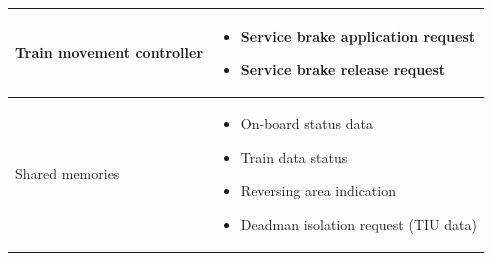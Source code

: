 \documentclass[nocc]{template/openetcs_report}
\begin{document}
\begin{longtable}{|l|l|}
				\hline
				
					\begin{minipage}[t]{0.35\linewidth} Train movement controller	\end{minipage} 
				&	\begin{minipage}[t]{0.65\linewidth}
						\begin{itemize}
							\item Service brake application request
							\item Service brake release request
						\end{itemize}			
					\end{minipage} \\
				
				\hline
				
					\begin{minipage}[t]{0.35\linewidth} Shared memories	\end{minipage} 
				&	\begin{minipage}[t]{0.65\linewidth}
						\begin{itemize}
							\item On-board status data
							\item Train data status
							\item Reversing area indication
							\item Deadman isolation request (TIU data)
						\end{itemize}				
					\end{minipage} \\
				
				\hline	
			\end{longtable}
\newpage				
\end{document}
